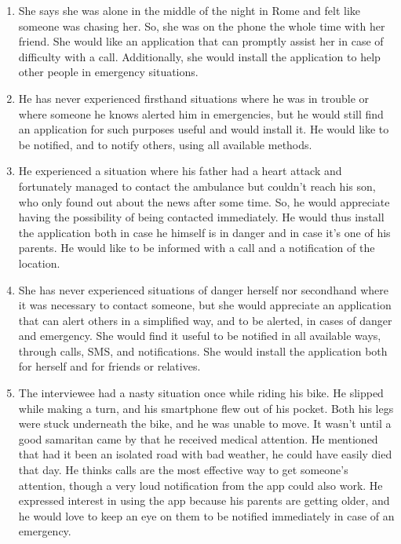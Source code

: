 \documentclass[12pt]{article}
\begin{document}
\begin{enumerate}
    \item She says she was alone in the middle of the night in Rome and felt 
    like someone was chasing her. So, she was on the phone the whole time 
    with her friend. She would like an application that can promptly assist 
    her in case of difficulty with a call. Additionally, she would install the 
    application to help other people in emergency situations.
    
    \item He has never experienced firsthand situations where he was in trouble 
    or where someone he knows alerted him in emergencies, but he would still 
    find an application for such purposes useful and would install it. 
    He would like to be notified, and to notify others, using all available 
    methods.
    
    \item He experienced a situation where his father had a heart attack 
    and fortunately managed to contact the ambulance but couldn't reach 
    his son, who only found out about the news after some time. So, he 
    would appreciate having the possibility of being contacted immediately. 
    He would thus install the application both in case he himself is in 
    danger and in case it's one of his parents. He would like to be 
    informed with a call and a notification of the location.
    
    \item She has never experienced situations of danger herself nor 
    secondhand where it was necessary to contact someone, but she would 
    appreciate an application that can alert others in a simplified way, 
    and to be alerted, in cases of danger and emergency. She would find it 
    useful to be notified in all available ways, through calls, SMS, and 
    notifications. She would install the application both for herself and 
    for friends or relatives.

    \item The interviewee had a nasty situation once while riding his bike. 
    He slipped while making a turn, and his smartphone flew out of his pocket. 
    Both his legs were stuck underneath the bike, and he was unable to move. 
    It wasn't until a good samaritan came by that he received medical 
    attention. He mentioned that had it been an isolated road with bad 
    weather, he could have easily died that day. He thinks calls are the 
    most effective way to get someone's attention, though a very loud 
    notification from the app could also work. He expressed interest in 
    using the app because his parents are getting older, and he would love 
    to keep an eye on them to be notified immediately in case of an 
    emergency.


\end{enumerate}
\end{document}
